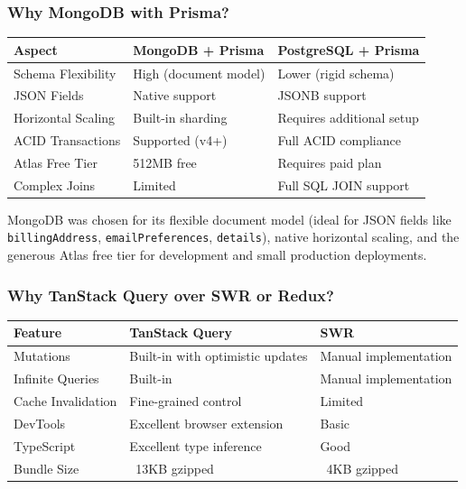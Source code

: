 \documentclass[12pt,onecolumn]{IEEEtran}
\begin{document}
\subsubsection{Why MongoDB with Prisma?}

\begin{center}
\begin{tabularx}{\textwidth}{lXX}
  \toprule
  \textbf{Aspect} & \textbf{MongoDB + Prisma} & \textbf{PostgreSQL + Prisma} \\
  \midrule
  Schema Flexibility & High (document model) & Lower (rigid schema) \\
  JSON Fields & Native support & JSONB support \\
  Horizontal Scaling & Built-in sharding & Requires additional setup \\
  ACID Transactions & Supported (v4+) & Full ACID compliance \\
  Atlas Free Tier & 512MB free & Requires paid plan \\
  Complex Joins & Limited & Full SQL JOIN support \\
  \bottomrule
\end{tabularx}
\end{center}

MongoDB was chosen for its flexible document model (ideal for JSON fields like \texttt{billingAddress}, \texttt{emailPreferences}, \texttt{details}), native horizontal scaling, and the generous Atlas free tier for development and small production deployments.

\subsubsection{Why TanStack Query over SWR or Redux?}

\begin{center}
\begin{tabularx}{\textwidth}{lXX}
  \toprule
  \textbf{Feature} & \textbf{TanStack Query} & \textbf{SWR} \\
  \midrule
  Mutations & Built-in with optimistic updates & Manual implementation \\
  Infinite Queries & Built-in & Manual implementation \\
  Cache Invalidation & Fine-grained control & Limited \\
  DevTools & Excellent browser extension & Basic \\
  TypeScript & Excellent type inference & Good \\
  Bundle Size & ~13KB gzipped & ~4KB gzipped \\
  \bottomrule
\end{tabularx}
\end{center}
\end{document}
